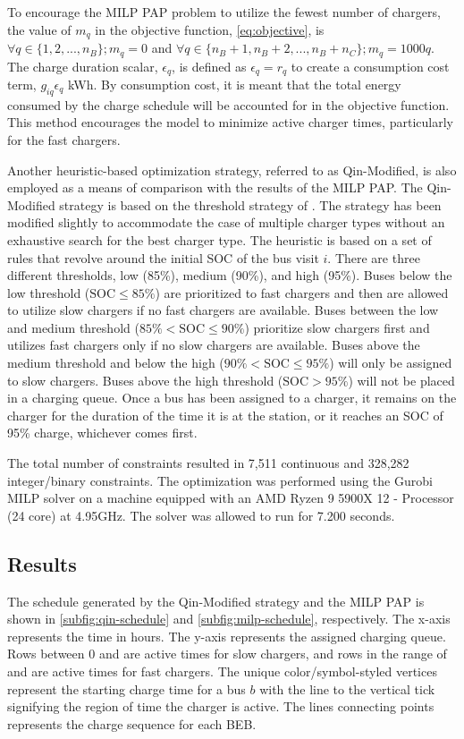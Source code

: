 \documentclass[utf8]{FrontiersinHarvard}
\let\cite\citep                                       %
\newcommand{\fast}{15 }                                                         %
\newcommand{\slow}{15 }                                                         %
\newcommand{\contvars}{7,511 }
\newcommand{\intvars}{328,282 }
\newcommand{\timeran}{7,200 }                                                    %
\begin{document}
To encourage the MILP PAP problem to utilize the fewest number of chargers, the value of \(m_q\) in the objective
function, \autoref{eq:objective}, is \(\forall q \in \{1,2,..., n_B \}; m_q = 0\) and \(\forall q \in \{n_B + 1, n_B + 2,..., n_B + n_C \};
m_q = 1000q\). The charge duration scalar, \(\epsilon_q\), is defined as \(\epsilon_q = r_q\) to create a consumption cost term,
\(g_{iq}\epsilon_q\) kWh. By consumption cost, it is meant that the total energy consumed by the charge schedule will be
accounted for in the objective function. This method encourages the model to minimize active charger times, particularly
for the fast chargers.

Another heuristic-based optimization strategy, referred to as Qin-Modified, is also employed as a means of comparison
with the results of the MILP PAP. The Qin-Modified strategy is based on the threshold strategy of
\cite{qin-2016-numer-analy}. The strategy has been modified slightly to accommodate the case of multiple charger types
without an exhaustive search for the best charger type. The heuristic is based on a set of rules that revolve around the
initial SOC of the bus visit \(i\). There are three different thresholds, low (85\%), medium (90\%), and
high (95\%). Buses below the low threshold (\(\text{SOC} \le 85\%\)) are prioritized to fast chargers and then are allowed to
utilize slow chargers if no fast chargers are available. Buses between the low and medium threshold (\(85\% < \text{SOC}
\le 90\%\)) prioritize slow chargers first and utilizes fast chargers only if no slow chargers are available. Buses above
the medium threshold and below the high (\(90\% < \text{SOC} \le 95\%\)) will only be assigned to slow chargers. Buses above
the high threshold (\(\text{SOC} > 95\%\)) will not be placed in a charging queue. Once a bus has been assigned to a
charger, it remains on the charger for the duration of the time it is at the station, or it reaches an SOC of 95\%
charge, whichever comes first.

The total number of constraints resulted in \contvars continuous and \intvars integer/binary constraints. The
optimization was performed using the Gurobi MILP solver \cite{gurobi-2021-gurob-optim} on a machine equipped with an
AMD Ryzen 9 5900X 12 - Processor (24 core) at 4.95GHz. The solver was allowed to run for \num{\timeran} seconds.

\subsection{Results}
\label{results}
The schedule generated by the Qin-Modified strategy and the MILP PAP is shown in \autoref{subfig:qin-schedule} and
\autoref{subfig:milp-schedule}, respectively. The x-axis represents the time in hours. The y-axis represents the
assigned charging queue. Rows between 0 and \fpeval{\slow - 1} are active times for slow chargers, and rows in the range
of \fpeval{\slow} and \fpeval{\fast + \slow - 1} are active times for fast chargers. The unique color/symbol-styled
vertices represent the starting charge time for a bus \(b\) with the line to the vertical tick signifying the region of
time the charger is active. The lines connecting points represents the charge sequence for each BEB.
\end{document}

